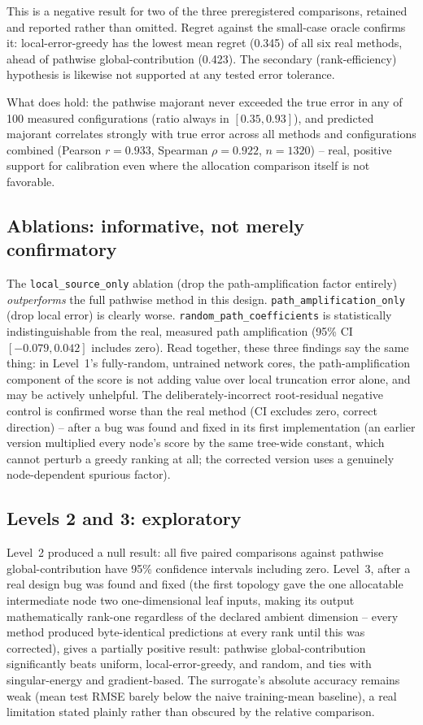 \documentclass[11pt]{amsart}
\theoremstyle{remark}
\theoremstyle{definition}
\begin{document}
This is a negative result for two of the three preregistered comparisons, retained and
reported rather than omitted. Regret against the small-case oracle confirms it:
local-error-greedy has the lowest mean regret (0.345) of all six real methods, ahead of
pathwise global-contribution (0.423). The secondary (rank-efficiency) hypothesis is
likewise not supported at any tested error tolerance.

What does hold: the pathwise majorant never exceeded the true error in any of 100 measured
configurations (ratio always in $[0.35, 0.93]$), and predicted majorant correlates strongly
with true error across all methods and configurations combined (Pearson $r=0.933$, Spearman
$\rho=0.922$, $n=1320$) -- real, positive support for calibration even where the allocation
comparison itself is not favorable.

\subsection{Ablations: informative, not merely confirmatory}

The \texttt{local\_source\_only} ablation (drop the path-amplification factor entirely)
\emph{outperforms} the full pathwise method in this design. \texttt{path\_amplification\_only}
(drop local error) is clearly worse. \texttt{random\_path\_coefficients} is statistically
indistinguishable from the real, measured path amplification (95\% CI $[-0.079,0.042]$
includes zero). Read together, these three findings say the same thing: in Level~1's
fully-random, untrained network cores, the path-amplification component of the score is not
adding value over local truncation error alone, and may be actively unhelpful. The
deliberately-incorrect root-residual negative control is confirmed worse than the real
method (CI excludes zero, correct direction) -- after a bug was found and fixed in its first
implementation (an earlier version multiplied every node's score by the same tree-wide
constant, which cannot perturb a greedy ranking at all; the corrected version uses a
genuinely node-dependent spurious factor).

\subsection{Levels 2 and 3: exploratory}

Level~2 produced a null result: all five paired comparisons against pathwise
global-contribution have 95\% confidence intervals including zero. Level~3, after a real
design bug was found and fixed (the first topology gave the one allocatable intermediate
node two one-dimensional leaf inputs, making its output mathematically rank-one regardless
of the declared ambient dimension -- every method produced byte-identical predictions at
every rank until this was corrected), gives a partially positive result: pathwise
global-contribution significantly beats uniform, local-error-greedy, and random, and ties
with singular-energy and gradient-based. The surrogate's absolute accuracy remains weak
(mean test RMSE barely below the naive training-mean baseline), a real limitation stated
plainly rather than obscured by the relative comparison.
\end{document}
